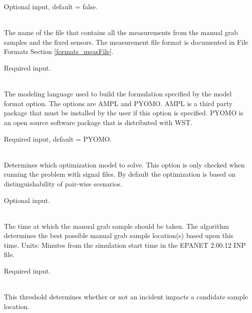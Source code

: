 \begin{description}[topsep=0pt,parsep=0.5em,itemsep=-0.4em]
\begin{description}[topsep=0pt,parsep=0.5em,itemsep=-0.4em]
                Optional input, default = false.
  \end{description}
  \item[{measurements}]\hfill
  \begin{description}[topsep=0pt,parsep=0.5em,itemsep=-0.4em]
    \item[{grab samples}]\hfill
\\The name of the file that contains all the measurements from 
                the manual grab samples and the fixed sensors. The measurement file 
                format is documented in File Formats Section \ref{formats_measFile}.

                Required input.
  \end{description}
  \item[{grabsample}]\hfill
  \begin{description}[topsep=0pt,parsep=0.5em,itemsep=-0.4em]
    \item[{model format}]\hfill
\\The modeling language used to build the formulation specified
                by the model format option. The options are AMPL and PYOMO. 
                AMPL is a third party package that must be installed by 
                the user if this option is specified. PYOMO is an open source 
                software package that is distributed with WST.
       
                Required input, default = PYOMO.
    \item[{sample criteria}]\hfill
\\ Determines which optimization model to solve. This option is 
                only checked when running the problem with signal files. By default
                the optimization is based on distinguishability of pair-wise scenarios.
       
                Optional input.
    \item[{sample time}]\hfill
\\The time at which the manual grab sample should be taken. 
                The algorithm determines the best possible manual grab sample location(s)
                based upon this time. Units: Minutes from the simulation start time in the
                EPANET 2.00.12 INP file. 

                Required input.
    \item[{threshold}]\hfill
\\This threshold determines whether or not an incident impacts a candidate
                sample location.


\end{description}
\end{description}
